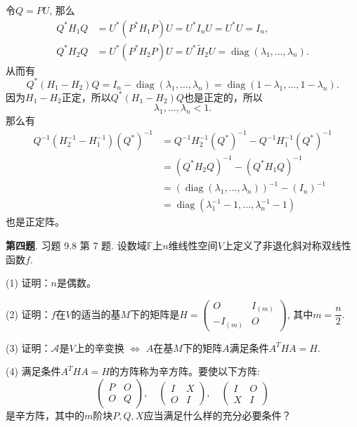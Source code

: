 令$Q = PU$, 那么
\begin{align*}
Q^* H_1 Q & = U^* \left( P^* H_1 P \right) U = U^* I_n U = U^* U = I_n, \\
Q^* H_2 Q & = U^* \left( P^* H_2 P \right) U = U^* \widetilde{H}_2 U = \operatorname{diag} (\lambda_1, \ldots, \lambda_n).
\end{align*}
从而有
$$Q^* (H_1 - H_2) Q = I_n - \operatorname{diag} (\lambda_1, \ldots, \lambda_n) = \operatorname{diag} (1-\lambda_1, \ldots, 1-\lambda_n).$$
因为$H_1 - H_2$正定，所以$Q^* (H_1 - H_2) Q$也是正定的，所以
$$\lambda_1, \ldots, \lambda_n < 1.$$
那么有
\begin{align*}
 Q^{-1} \left( H_2^{-1} - H_1^{-1} \right) \left( Q^* \right)^{-1} & = Q^{-1} H_2^{-1} \left( Q^* \right)^{-1} - Q^{-1} H_1^{-1} \left( Q^* \right)^{-1} \\
& = \left( Q^* H_2 Q \right)^{-1} - \left( Q^* H_1 Q \right)^{-1} \\
& = \left( \operatorname{diag} (\lambda_1, \ldots, \lambda_n) \right)^{-1} - \left( I_n \right)^{-1} \\
& = \operatorname{diag} (\lambda_1^{-1} - 1, \ldots, \lambda_n^{-1} - 1)
\end{align*}
也是正定阵。


\newpageorvspace


{\bf 第四题}. 习题 9.8 第 7 题. 设数域$\mathbb{F}$上$n$维线性空间$V$上定义了非退化斜对称双线性函数$f$.

(1) 证明：$n$是偶数。

(2) 证明：$f$在$V$的适当的基$M$下的矩阵是$H = \begin{pmatrix} O & I_{(m)} \\ -I_{(m)} & O \end{pmatrix}$, 其中$m = \dfrac{n}{2}$.

(3) 证明：$\mathcal{A}$是$V$上的辛变换 $\Leftrightarrow$ $A$在基$M$下的矩阵$A$满足条件$A^THA = H$.

(4) 满足条件$A^THA = H$的方阵称为辛方阵。要使以下方阵:
$$
\begin{pmatrix} P & O \\ O & Q \end{pmatrix}, \quad
\begin{pmatrix} I & X \\ O & I \end{pmatrix}, \quad
\begin{pmatrix} I & O \\ X & I \end{pmatrix}
$$
是辛方阵，其中的$m$阶块$P, Q, X$应当满足什么样的充分必要条件？

